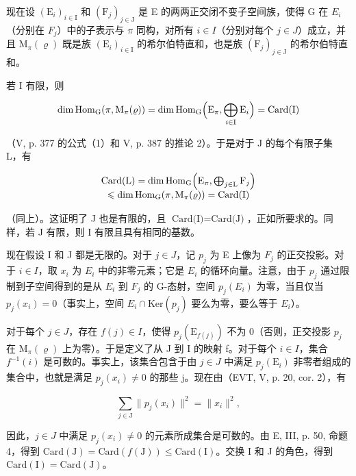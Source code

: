 现在设 \((\mathrm{E}_{i})_{i\in\mathrm{I}}\) 和 \((\mathrm{F}_{j})_{j\in\mathrm{J}}\) 是 E 的两两正交闭不变子空间族，使得 G 在 \(E_{i}\)（分别在 \(F_{j}\)）中的子表示与 \(\pi\) 同构，对所有 \(i\in I\)（分别对每个 \(j\in J\)）成立，并且 \(\mathrm{M}_{\pi}(\varrho)\) 既是族 \((\mathrm{E}_{i})_{i\in\mathrm{I}}\) 的希尔伯特直和，也是族 \((\mathrm{F}_{j})_{j\in\mathrm{J}}\) 的希尔伯特直和。

若 I 有限，则

\[
\dim \operatorname{Hom} _ {\mathrm{G}} (\pi , \mathrm{M} _ {\pi} (\varrho)) = \dim \operatorname{Hom} _ {\mathrm{G}} \Bigl (\mathrm{E} _ {\pi}, \bigoplus_ {i \in \mathrm{I}} \mathrm{E} _ {i} \Bigr) = \operatorname{Card} (\mathrm{I})
\]

（V, p. 377 的公式（1）和 V, p. 387 的推论 2）。于是对于 J 的每个有限子集 L，有

\[
\begin{array}{c} \operatorname{Card} (\mathrm{L}) = \dim \operatorname{Hom} _ {\mathrm{G}} \Bigl (\mathrm{E} _ {\pi}, \bigoplus_ {j \in \mathrm{L}} \mathrm{F} _ {j} \Bigr) \\ \leqslant \dim \operatorname{Hom} _ {\mathrm{G}} (\pi , \operatorname{M} _ {\pi} (\varrho)) = \operatorname{Card} (\mathrm{I}) \end{array}
\]

（同上）。这证明了 J 也是有限的，且 \(\text{Card(I)} = \text{Card(J)}\)，正如所要求的。同样，若 J 有限，则 I 有限且具有相同的基数。

现在假设 I 和 J 都是无限的。对于 \(j \in J\)，记 \(p_{j}\) 为 E 上像为 \(F_{j}\) 的正交投影。对于 \(i \in I\)，取 \(x_{i}\) 为 \(E_{i}\) 中的非零元素；它是 \(E_{i}\) 的循环向量。注意，由于 \(p_{j}\) 通过限制到子空间得到的是从 \(E_{i}\) 到 \(F_{j}\) 的 G-态射，空间 \(p_{j}(E_{i})\) 为零，当且仅当 \(p_{j}(x_{i}) = 0\)（事实上，空间 \(E_{i} \cap \text{Ker}(p_{j})\) 要么为零，要么等于 \(E_{i}\)）。

对于每个 \(j \in J\)，存在 \(f(j) \in I\)，使得 \(p_{j}(\mathrm{E}_{f(j)})\) 不为 0（否则，正交投影 \(p_{j}\) 在 \(\mathrm{M}_{\pi}(\varrho)\) 上为零）。于是定义了从 J 到 I 的映射 f。对于每个 \(i \in I\)，集合 \(f^{-1}(i)\) 是可数的。事实上，该集合包含于由 \(j \in J\) 中满足 \(p_{j}(\mathrm{E}_{i})\) 非零者组成的集合中，也就是满足 \(p_{j}(x_{i}) \neq 0\) 的那些 j。现在由（EVT, V, p. 20, cor. 2），有

\[
\sum_ {j \in \mathrm{J}} \| p _ {j} (x _ {i}) \| ^ {2} = \| x _ {i} \| ^ {2},
\]

因此，\(j \in J\) 中满足 \(p_{j}(x_{i}) \neq 0\) 的元素所成集合是可数的。由 E, III, p. 50, 命题 4，得到 \(\text{Card}(\text{J}) = \text{Card}(f(\text{J})) \leqslant \text{Card}(\text{I})\)。交换 I 和 J 的角色，得到 \(\text{Card}(\text{I}) = \text{Card}(\text{J})\)。

